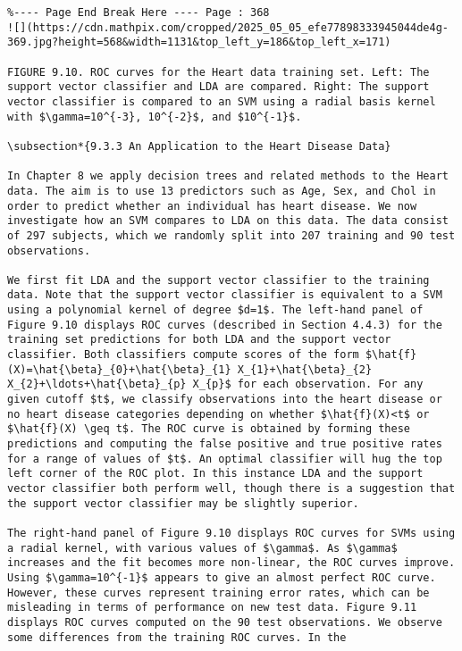 \documentclass[10pt]{article}
\begin{document}
\begin{verbatim}
%---- Page End Break Here ---- Page : 368
![](https://cdn.mathpix.com/cropped/2025_05_05_efe77898333945044de4g-369.jpg?height=568&width=1131&top_left_y=186&top_left_x=171)

FIGURE 9.10. ROC curves for the Heart data training set. Left: The support vector classifier and LDA are compared. Right: The support vector classifier is compared to an SVM using a radial basis kernel with $\gamma=10^{-3}, 10^{-2}$, and $10^{-1}$.

\subsection*{9.3.3 An Application to the Heart Disease Data}

In Chapter 8 we apply decision trees and related methods to the Heart data. The aim is to use 13 predictors such as Age, Sex, and Chol in order to predict whether an individual has heart disease. We now investigate how an SVM compares to LDA on this data. The data consist of 297 subjects, which we randomly split into 207 training and 90 test observations.

We first fit LDA and the support vector classifier to the training data. Note that the support vector classifier is equivalent to a SVM using a polynomial kernel of degree $d=1$. The left-hand panel of Figure 9.10 displays ROC curves (described in Section 4.4.3) for the training set predictions for both LDA and the support vector classifier. Both classifiers compute scores of the form $\hat{f}(X)=\hat{\beta}_{0}+\hat{\beta}_{1} X_{1}+\hat{\beta}_{2} X_{2}+\ldots+\hat{\beta}_{p} X_{p}$ for each observation. For any given cutoff $t$, we classify observations into the heart disease or no heart disease categories depending on whether $\hat{f}(X)<t$ or $\hat{f}(X) \geq t$. The ROC curve is obtained by forming these predictions and computing the false positive and true positive rates for a range of values of $t$. An optimal classifier will hug the top left corner of the ROC plot. In this instance LDA and the support vector classifier both perform well, though there is a suggestion that the support vector classifier may be slightly superior.

The right-hand panel of Figure 9.10 displays ROC curves for SVMs using a radial kernel, with various values of $\gamma$. As $\gamma$ increases and the fit becomes more non-linear, the ROC curves improve. Using $\gamma=10^{-1}$ appears to give an almost perfect ROC curve. However, these curves represent training error rates, which can be misleading in terms of performance on new test data. Figure 9.11 displays ROC curves computed on the 90 test observations. We observe some differences from the training ROC curves. In the


\end{verbatim}
\end{document}
